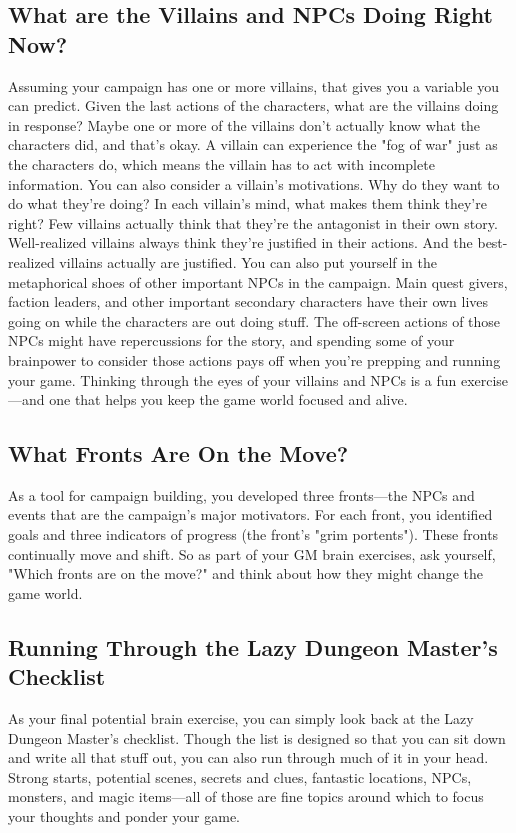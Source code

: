 \documentclass[10pt,a4paper,twoside,bg=print,twocolumn,openany,nodeprecatedcode]{dndbook}
\begin{document}
\subsection{What are the Villains and NPCs Doing Right Now?}
Assuming your campaign has one or more villains, that gives you a variable you can predict. Given the last actions of the characters, what are the villains doing in response? Maybe one or more of the villains don't actually know what the characters did, and that's okay. A villain can experience the "fog of war" just as the characters do, which means the villain has to act with incomplete information.
You can also consider a villain's motivations. Why do they want to do what they're doing? In each villain's mind, what makes them think they're right? Few villains actually think that they're the antagonist in their own story. Well-realized villains always think they're justified in their actions. And the best-realized villains actually are justified.
You can also put yourself in the metaphorical shoes of other important NPCs in the campaign. Main quest givers, faction leaders, and other important secondary characters have their own lives going on while the characters are out doing stuff. The off-screen actions of those NPCs might have repercussions for the story, and spending some of your brainpower to consider those actions pays off when you're prepping and running your game.
Thinking through the eyes of your villains and NPCs is a fun exercise—and one that helps you keep the game world focused and alive.
\subsection{What Fronts Are On the Move?}
As a tool for campaign building, you developed three fronts—the NPCs and events that are the campaign's major motivators. For each front, you identified goals and three indicators of progress (the front's "grim portents"). These fronts continually move and shift. So as part of your GM brain exercises, ask yourself, "Which fronts are on the move?" and think about how they might change the game world.
\subsection{Running Through the Lazy Dungeon Master's Checklist}
As your final potential brain exercise, you can simply look back at the Lazy Dungeon Master's checklist. Though the list is designed so that you can sit down and write all that stuff out, you can also run through much of it in your head. Strong starts, potential scenes, secrets and clues, fantastic locations, NPCs, monsters, and magic items—all of those are fine topics around which to focus your thoughts and ponder your game.
\end{document}

